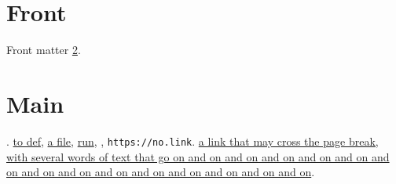 \documentclass{article}
\begin{document}
\section{Front}\label{f}
Front matter \ref{m}.
\newpage
{}
\section{Main}\label{m}
. \hyperref{}{cat}{nm}{to def}, \href{other.pdf#page.2}{a file}, \href{run:./x.sh}{run},
, \nolinkurl{https://no.link}.
\vspace*{36\baselineskip}
\href{https://example.com/across}{a link that may cross the page break, with several words of text that go on and on and on and on and on and on and on and on and on and on and on and on and on and on and on}.
\begin{Form}
\quad {}\quad {}
\end{Form}
\end{document}
